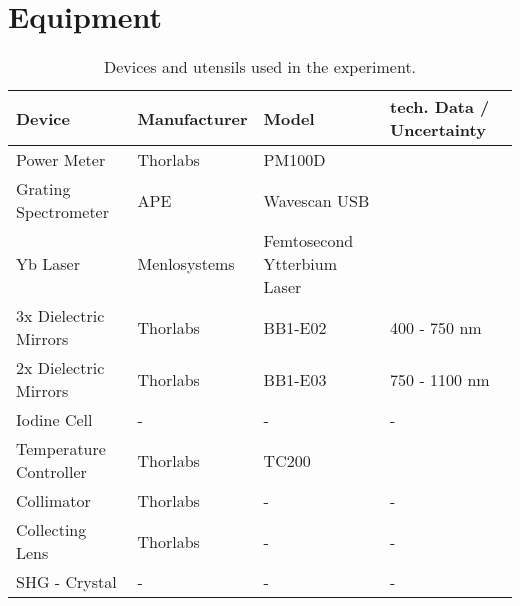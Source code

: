 \section{Equipment}
\label{sec:geraeteliste}
\begin{table}[H]
	\centering
	\caption{
		Devices and utensils used in the experiment.
		}
	\begin{tabular}[h]{| l | l | l | l |}
		\hline
		Device     & Manufacturer   & Model  & tech. Data / Uncertainty       \\\hline
		\hline
		Power Meter & Thorlabs & PM100D & \cite{Power} \\ \hline
		Grating Spectrometer & APE & Wavescan USB &  \cite{Speck} \\ \hline
		Yb Laser & Menlosystems & Femtosecond Ytterbium Laser & \cite{Laser} \\ \hline
		3x Dielectric Mirrors & Thorlabs & BB1-E02 & 400 - 750 nm \\ \hline
		2x Dielectric Mirrors & Thorlabs & BB1-E03 & 750 - 1100 nm \\ \hline
		Iodine Cell & - & - & - \\ \hline
 		Temperature Controller & Thorlabs & TC200 & \cite{TempC} \\ \hline
		Collimator &Thorlabs & - &- \\ \hline 
		Collecting Lens & Thorlabs & -& - \\ \hline
		SHG - Crystal & - & - & - \\ \hline
	\end{tabular}
	\label{tab:Geraeteliste}
\end{table}
\newpage